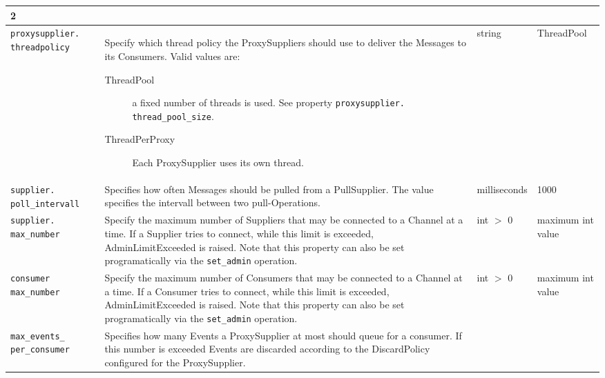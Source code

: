 \begin{small}
\begin{longtable}{|p{5cm}|p{7.5cm}|p{1.5cm}|p{1.5cm}|}
    2 \\ \hline

    \verb"proxysupplier."
    \verb"threadpolicy" &

    Specify which thread policy the ProxySuppliers should use to deliver
    the Messages to its Consumers. Valid values are:
    \begin{description}
    \item[ThreadPool] a fixed number of threads is used. See property
      \verb"proxysupplier."
      \verb"thread_pool_size".

    \item[ThreadPerProxy] Each ProxySupplier uses its own thread.

    \end{description} &
    string & Thread\-Pool \\ \hline

    \verb"supplier."
    \verb"poll_intervall" &

    Specifies how often Messages should be pulled from a PullSupplier. The
    value specifies the intervall between two pull-Operations. &

    milli\-seconds & 1000 \\ \hline

    \verb"supplier."
    \verb"max_number" &

    Specify the maximum number of Suppliers that may be connected to a
    Channel at a time. If a Supplier tries to connect, while this
    limit is exceeded, AdminLimitExceeded is raised. Note that this
    property can also be set programatically via the \texttt{set\_admin}
    operation. & int $>$ 0 & maximum int value \\ \hline

    \verb"consumer"
    \verb"max_number" &

    Specify the maximum number of Consumers that may be connected to a
    Channel at a time. If a Consumer tries to connect, while this
    limit is exceeded, AdminLimitExceeded is raised. Note that this
    property can also be set programatically via the
    \texttt{set\_admin} operation. &

    int $>$ 0 & maximum int value \\ \hline

    \verb"max_events_"
    \verb"per_consumer" &

    Specifies how many Events a ProxySupplier at most should queue for a
    consumer. If this number is exceeded Events are discarded according to
    the DiscardPolicy configured for the ProxySupplier. &


\end{longtable}
\end{small}
